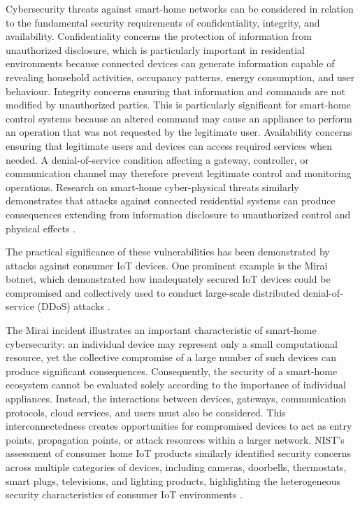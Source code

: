 Cybersecurity threats against smart-home networks can be considered in relation to the fundamental security requirements of confidentiality, integrity, and availability. Confidentiality concerns the protection of information from unauthorized disclosure, which is particularly important in residential environments because connected devices can generate information capable of revealing household activities, occupancy patterns, energy consumption, and user behaviour. Integrity concerns ensuring that information and commands are not modified by unauthorized parties. This is particularly significant for smart-home control systems because an altered command may cause an appliance to perform an operation that was not requested by the legitimate user. Availability concerns ensuring that legitimate users and devices can access required services when needed. A denial-of-service condition affecting a gateway, controller, or communication channel may therefore prevent legitimate control and monitoring operations. Research on smart-home cyber-physical threats similarly demonstrates that attacks against connected residential systems can produce consequences extending from information disclosure to unauthorized control and physical effects \citep{heartfieldTaxonomyCyberphysicalThreats2018}.

The practical significance of these vulnerabilities has been demonstrated by attacks against consumer IoT devices. One prominent example is the Mirai botnet, which demonstrated how inadequately secured IoT devices could be compromised and collectively used to conduct large-scale distributed denial-of-service (DDoS) attacks \cite{antonakakisUnderstandingMiraiBotnet}.

The Mirai incident illustrates an important characteristic of smart-home cybersecurity: an individual device may represent only a small computational resource, yet the collective compromise of a large number of such devices can produce significant consequences. Consequently, the security of a smart-home ecosystem cannot be evaluated solely according to the importance of individual appliances. Instead, the interactions between devices, gateways, communication protocols, cloud services, and users must also be considered. This interconnectedness creates opportunities for compromised devices to act as entry points, propagation points, or attack resources within a larger network. NIST's assessment of consumer home IoT products similarly identified security concerns across multiple categories of devices, including cameras, doorbells, thermostats, smart plugs, televisions, and lighting products, highlighting the heterogeneous security characteristics of consumer IoT environments \citep{faganProfileIoTCore2022}.

